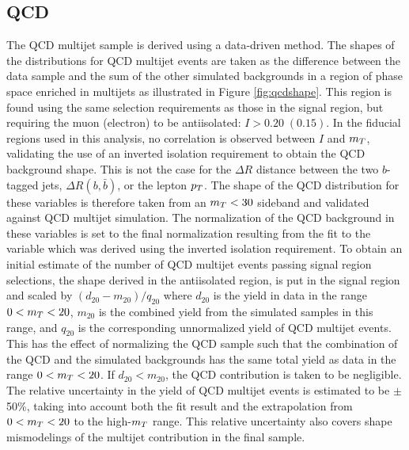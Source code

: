 \subsection{QCD}
\label{sec:qcd}
The QCD multijet sample is derived using a data-driven method. 
The shapes of the distributions for QCD multijet events are taken as the difference between
 the data sample and the sum of the other simulated backgrounds in a region of phase
 space enriched in multijets as illustrated in Figure \ref{fig:qcdshape}.
This region is found using the same selection requirements as those in the signal region,
 but requiring the muon (electron) to be antiisolated: $I > 0.20 \; (0.15)$.
In the fiducial regions used in this analysis,
 no correlation is observed between $I$ and $m_T$, validating
 the use of an inverted isolation requirement to obtain
 the QCD background shape.
This is not the case for the $\Delta R$ distance between the
 two $b$-tagged jets, $\Delta R(b,\bar{b})$, or the lepton $p_T$.
The shape of the QCD distribution for these variables is therefore
 taken from an $m_T<30$ \GeV sideband and validated against
 QCD multijet simulation.
The normalization of the QCD background
 in these variables is set to the final
 normalization resulting from the fit to the \mt variable
 which was derived using the inverted isolation requirement.
To obtain an initial estimate of the number of QCD multijet
 events passing signal region selections, the
 shape derived in the antiisolated region, is
 put in the signal region and scaled by $ (d_{20}-m_{20})/q_{20} $ where
 $d_{20}$ is the yield in data in the range $0<m_T<20$, $m_{20}$ is the combined
 yield from the simulated samples in this range, and $q_{20}$ is the corresponding
 unnormalized yield of QCD multijet events.
This has the effect of normalizing the QCD sample such that the combination of the QCD 
 and the simulated backgrounds has the same total yield as data in the range $0<m_T<20$.
If $d_{20}<m_{20}$, the QCD contribution is taken to be negligible. %
The relative uncertainty in the yield of QCD multijet events is
 estimated to be $\pm$50\%, taking into account both the fit result
 and the extrapolation from $0<m_T<20$ to the high-$m_T$ range.
This relative uncertainty also covers shape mismodelings
 of the multijet contribution in the final sample.


